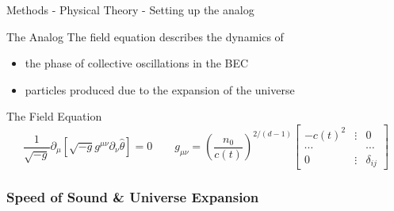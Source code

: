 \documentclass[aspectratio=169]{beamer}
\begin{document}
            \begin{frame}{Methods - Physical Theory - Setting up the analog}
            \begin{alertblock}{\centering The Analog}
                The field equation describes the dynamics of
                \begin{itemize}
                    \item the phase of collective oscillations in the BEC
                    \item particles produced due to the expansion of the universe
                \end{itemize}
            \end{alertblock}
            \begin{exampleblock}{\centering The Field Equation}
                        \begin{equation*}
                            \frac{1}{\sqrt{-g}} \partial_\mu \left[ \sqrt{-g} g^{\mu \nu} \partial_\nu \hat{\theta} \right] = 0
                            \qquad
                            g_{\mu \nu} = \left( \frac{n_0}{c(t)} \right)^{2 / (d - 1)} \begin{bmatrix}
                                -c(t)^2 & \vdots & 0 \\
                                \cdots & & \cdots \\
                                0 & \vdots & \delta_{ij}
                            \end{bmatrix}
                        \end{equation*}
                        \end{exampleblock}
            \end{frame}

        \subsubsection{Speed of Sound \& Universe Expansion}
\end{document}
